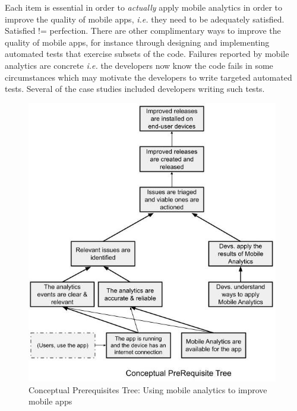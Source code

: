 Each item is essential in order to \emph{actually} apply mobile analytics in order to improve the quality of mobile apps, \emph{i.e.} they need to be adequately satisfied. Satisfied != perfection. There are other complimentary ways to improve the quality of mobile apps, for instance through designing and implementing automated tests that exercise subsets of the code. Failures reported by mobile analytics are concrete \emph{i.e.} the developers now know the code fails in some circumstances which may motivate the developers to write targeted automated tests. Several of the case studies included developers writing such tests. 

\begin{figure}
    \centering
    \includegraphics[width=11cm]{images/my/Conceptual_prereq_tree_Applying_Theory_of_Constraints_to_using_Mobile_Analytics_to_improve_Mobile_Apps.jpeg}
    \caption{Conceptual Prerequisites Tree: Using mobile analytics to improve mobile apps}
    \label{fig:using-toc-cpt-using-mobile-analytics-to-improve-mobile-apps}
\end{figure}




